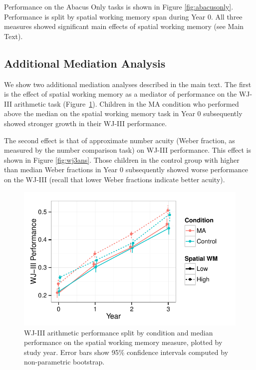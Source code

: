 \documentclass[11pt]{article}
\begin{document}
Performance on the Abacus Only tasks is shown in Figure \ref{fig:abacusonly}. Performance is split by spatial working memory span during Year 0. All three measures showed significant main effects of spatial working memory (see Main Text).

\subsection{Additional Mediation Analysis}

We show two additional mediation analyses described in the main text. The first is the effect of spatial working memory as a mediator of performance on the WJ-III arithmetic task (Figure~\ref{fig:wj3swm}). Children in the MA condition who performed above the median on the spatial working memory task in Year 0 subsequently showed stronger growth in their WJ-III performance. 

The second effect is that of approximate number acuity (Weber fraction, as measured by the number comparison task) on WJ-III performance. This effect is shown in Figure \ref{fig:wj3ans}. Those children in the control group with higher than median Weber fractions in Year 0 subsequently showed worse performance on the WJ-III (recall that lower Weber fractions indicate better acuity). 

\begin{figure}
\begin{center}
\includegraphics[width=4.5in]{figures/wj_by_swm.pdf}
\end{center}
\caption{WJ-III arithmetic performance split by condition and median performance on the spatial working memory measure, plotted by study year. Error bars show 95\% confidence intervals computed by non-parametric bootstrap.}
\label{fig:wj3swm}
\end{figure}
\end{document}
